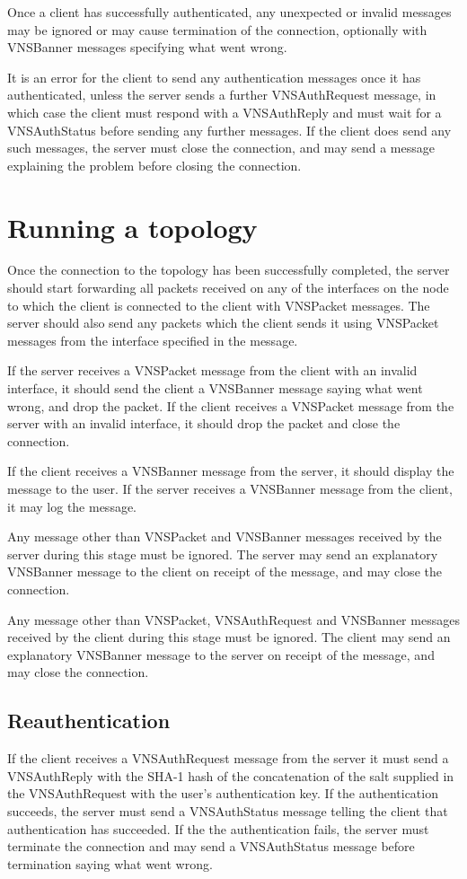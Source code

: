\documentclass[a4paper,12pt]{report}
\begin{document}
Once a client has successfully authenticated, any unexpected or invalid messages may be ignored or may cause termination of the connection, optionally with VNSBanner messages specifying what went wrong.

It is an error for the client to send any authentication messages once it has authenticated, unless the server sends a further VNSAuthRequest message, in which case the client must respond with a VNSAuthReply and must wait for a VNSAuthStatus before sending any further messages.  If the client does send any such messages, the server must close the connection, and may send a message explaining the problem before closing the connection.

\section{Running a topology}
Once the connection to the topology has been successfully completed, the server should start forwarding all packets received on any of the interfaces on the node to which the client is connected to the client with VNSPacket messages.  The server should also send any packets which the client sends it using VNSPacket messages from the interface specified in the message.

If the server receives a VNSPacket message from the client with an invalid interface, it should send the client a VNSBanner message saying what went wrong, and drop the packet.  If the client receives a VNSPacket message from the server with an invalid interface, it should drop the packet and close the connection.

If the client receives a VNSBanner message from the server, it should display the message to the user.  If the server receives a VNSBanner message from the client, it may log the message.

Any message other than VNSPacket and VNSBanner messages received by the server during this stage must be ignored.  The server may send an explanatory VNSBanner message to the client on receipt of the message, and may close the connection.

Any message other than VNSPacket, VNSAuthRequest and VNSBanner messages received by the client during this stage must be ignored.  The client may send an explanatory VNSBanner message to the server on receipt of the message, and may close the connection.

\subsection{Reauthentication}
If the client receives a VNSAuthRequest message from the server it must send a VNSAuthReply with the SHA-1 hash of the concatenation of the salt supplied in the VNSAuthRequest with the user's authentication key.  If the authentication succeeds, the server must send a VNSAuthStatus message telling the client that authentication has succeeded.  If the the authentication fails, the server must terminate the connection and may send a VNSAuthStatus message before termination saying what went wrong.
\end{document}
